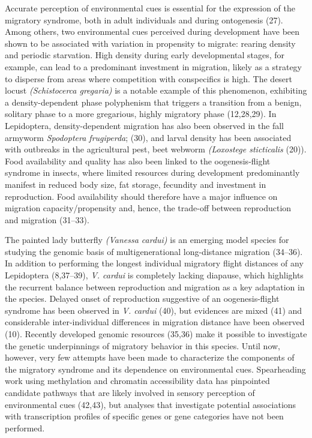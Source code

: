 \documentclass[lineno]{wiley-article}
\begin{document}
Accurate perception of environmental cues is essential for the expression of the migratory syndrome, both in adult individuals and during ontogenesis (27). Among others, two environmental cues perceived during development have been shown to be associated with variation in propensity to migrate: rearing density and periodic starvation. High density during early developmental stages, for example, can lead to a predominant investment in migration, likely as a strategy to disperse from areas where competition with conspecifics is high. The desert locust \textit{(Schistocerca gregaria)} is a notable example of this phenomenon, exhibiting a density-dependent phase polyphenism that triggers a transition from a benign, solitary phase to a more gregarious, highly migratory phase (12,28,29). In Lepidoptera, density-dependent migration has also been observed in the fall armyworm \textit{Spodoptera frugiperda}; (30), and larval density has been associated with outbreaks in the agricultural pest, beet webworm \textit{(Loxostege sticticalis} (20)). Food availability and quality has also been linked to the oogenesis-flight syndrome in insects, where limited resources during development predominantly manifest in reduced body size, fat storage, fecundity and investment in reproduction. Food availability should therefore have a major influence on migration capacity/propensity and, hence, the trade-off between reproduction and migration (31–33).

The painted lady butterfly \textit{(Vanessa cardui)} is an emerging model species for studying the genomic basis of multigenerational long-distance migration (34–36). In addition to performing the longest individual migratory flight distances of any Lepidoptera (8,37–39), \textit{V. cardui} is completely lacking diapause, which highlights the recurrent balance between reproduction and migration as a key adaptation in the species. Delayed onset of reproduction suggestive of an oogenesis-flight syndrome has been observed in \textit{V. cardui} (40), but evidences are mixed  (41) and considerable inter-individual differences in migration distance have been observed (10). Recently developed genomic resources (35,36) make it possible to investigate the genetic underpinnings of migratory behavior in this species. Until now, however, very few attempts have been made to characterize the components of the migratory syndrome and its dependence on environmental cues. Spearheading work using methylation and chromatin accessibility data has pinpointed candidate pathways that are likely involved in sensory perception of environmental cues (42,43), but analyses that investigate potential associations with transcription profiles of specific genes or gene categories have not been performed. 
\end{document}
